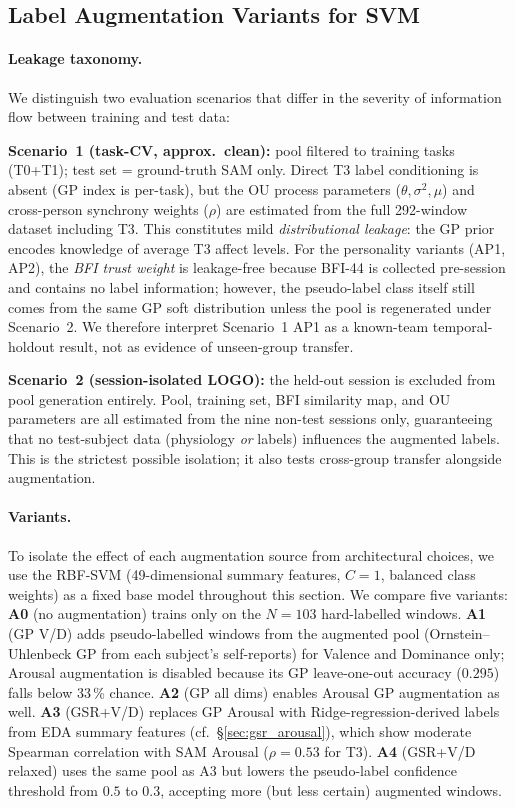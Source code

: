 \documentclass[sigconf,nonacm]{acmart}
\begin{document}
\subsection{Label Augmentation Variants for SVM}
\label{sec:aug_variants}

\paragraph{Leakage taxonomy.}
We distinguish two evaluation scenarios that differ in the severity of
information flow between training and test data:

\textbf{Scenario~1 (task-CV, approx.\ clean):} pool filtered to training tasks
(T0+T1); test set = ground-truth SAM only.
Direct T3 label conditioning is absent (GP index is per-task), but the OU
process parameters ($\theta,\sigma^2,\mu$) and cross-person synchrony weights
($\rho$) are estimated from the full 292-window dataset including T3.
This constitutes mild \emph{distributional leakage}: the GP prior encodes
knowledge of average T3 affect levels.
For the personality variants (AP1, AP2), the \emph{BFI trust weight} is
leakage-free because BFI-44 is collected pre-session and contains no label
information; however, the pseudo-label class itself still comes from the same
GP soft distribution unless the pool is regenerated under Scenario~2.
We therefore interpret Scenario~1 AP1 as a known-team temporal-holdout result,
not as evidence of unseen-group transfer.

\textbf{Scenario~2 (session-isolated LOGO):} the held-out session is excluded
from pool generation entirely.
Pool, training set, BFI similarity map, and OU parameters are all estimated
from the nine non-test sessions only, guaranteeing that no test-subject data
(physiology \emph{or} labels) influences the augmented labels.
This is the strictest possible isolation; it also tests cross-group
transfer alongside augmentation.

\paragraph{Variants.}
To isolate the effect of each augmentation source from architectural choices,
we use the RBF-SVM (49-dimensional summary features, $C{=}1$, balanced class
weights) as a fixed base model throughout this section.
We compare five variants:
\textbf{A0} (no augmentation) trains only on the $N{=}103$ hard-labelled windows.
\textbf{A1} (GP V/D) adds pseudo-labelled windows from the augmented pool
(Ornstein--Uhlenbeck GP from each subject's self-reports) for Valence and
Dominance only; Arousal augmentation is disabled because its GP leave-one-out
accuracy ($0.295$) falls below 33\,\% chance.
\textbf{A2} (GP all dims) enables Arousal GP augmentation as well.
\textbf{A3} (GSR+V/D) replaces GP Arousal with Ridge-regression-derived labels
from EDA summary features (cf.\ \S\ref{sec:gsr_arousal}), which show
moderate Spearman correlation with SAM Arousal ($\rho{=}0.53$ for T3).
\textbf{A4} (GSR+V/D relaxed) uses the same pool as A3 but lowers the
pseudo-label confidence threshold from $0.5$ to $0.3$, accepting more
(but less certain) augmented windows.
\end{document}
